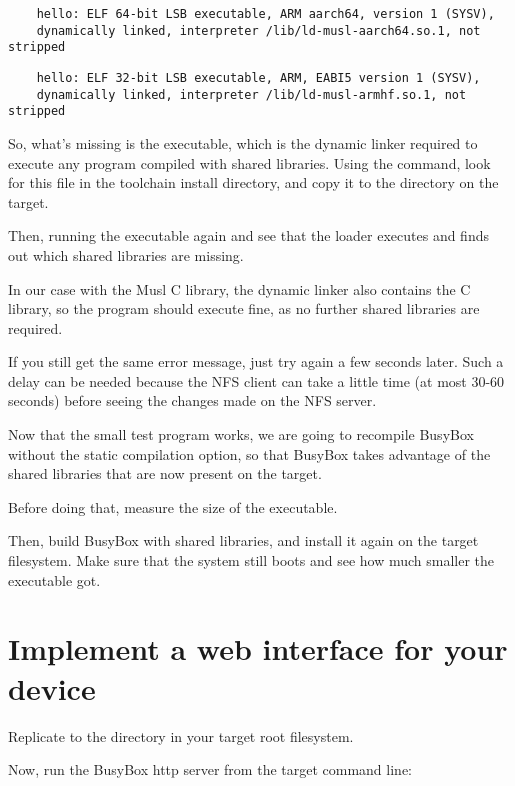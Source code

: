 \if{}
  \begin{verbatim}
    hello: ELF 64-bit LSB executable, ARM aarch64, version 1 (SYSV),
    dynamically linked, interpreter /lib/ld-musl-aarch64.so.1, not stripped
  \end{verbatim}
\else
  \begin{verbatim}
    hello: ELF 32-bit LSB executable, ARM, EABI5 version 1 (SYSV),
    dynamically linked, interpreter /lib/ld-musl-armhf.so.1, not stripped
  \end{verbatim} 
\fi
So, what's missing is the 
executable, which is the dynamic linker required to execute any
program compiled with shared libraries. Using the 
command, look for this file in the toolchain install directory,
and copy it to the  directory on the target.

Then, running the executable again and see that the loader executes
and finds out which shared libraries are missing.

In our case with the Musl C library, the dynamic linker also contains the
C library, so the program should execute fine, as no further shared
libraries are required.

If you still get the same error message, just try again a
few seconds later.  Such a delay can be needed because the NFS
client can take a little time (at most 30-60 seconds) before
seeing the changes made on the NFS server.

Now that the small test program works, we are going to recompile BusyBox
without the static compilation option, so that BusyBox takes
advantage of the shared libraries that are now present on the target.

Before doing that, measure the size of the  executable.

Then, build BusyBox with shared libraries, and install it again on the
target filesystem. Make sure that the system still boots and see how
much smaller the  executable got.

\section{Implement a web interface for your device}

Replicate  to the  directory in your target
root filesystem.

Now, run the BusyBox http server from the target command line:

